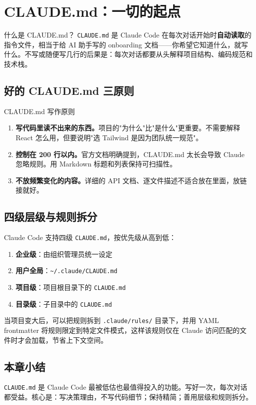 \section{CLAUDE.md：一切的起点}

\begin{knowledgebox}{什么是 CLAUDE.md？}
\texttt{CLAUDE.md} 是 Claude Code 在每次对话开始时\textbf{自动读取}的指令文件，相当于给 AI 助手写的 onboarding 文档——你希望它知道什么，就写什么。不写或随便写几行的后果是：每次对话都要从头解释项目结构、编码规范和技术栈。
\end{knowledgebox}

\subsection{好的 CLAUDE.md 三原则}

\begin{importantbox}{CLAUDE.md 写作原则}
\begin{enumerate}[leftmargin=1.5em]
  \item \textbf{写代码里读不出来的东西。}项目的"为什么"比"是什么"更重要。不需要解释 React 怎么用，但要说明"选 Tailwind 是因为团队统一规范"。
  \item \textbf{控制在 200 行以内。}官方文档明确提到，CLAUDE.md 太长会导致 Claude 忽略规则。用 Markdown 标题和列表保持可扫描性。
  \item \textbf{不放频繁变化的内容。}详细的 API 文档、逐文件描述不适合放在里面，放链接就好。
\end{enumerate}
\end{importantbox}

\subsection{四级层级与规则拆分}

Claude Code 支持四级 \texttt{CLAUDE.md}，按优先级从高到低：

\begin{enumerate}[leftmargin=1.5em]
  \item \textbf{企业级}：由组织管理员统一设定
  \item \textbf{用户全局}：\texttt{\textasciitilde/.claude/CLAUDE.md}
  \item \textbf{项目级}：项目根目录下的 \texttt{CLAUDE.md}
  \item \textbf{目录级}：子目录中的 \texttt{CLAUDE.md}
\end{enumerate}

当项目变大后，可以把规则拆到 \texttt{.claude/rules/} 目录下，并用 YAML frontmatter 将规则限定到特定文件模式，这样该规则仅在 Claude 访问匹配的文件时才会加载，节省上下文空间。

\subsection{本章小结}

\texttt{CLAUDE.md} 是 Claude Code 最被低估也最值得投入的功能。写好一次，每次对话都受益。核心是：写决策理由，不写代码细节；保持精简；善用层级和规则拆分。

